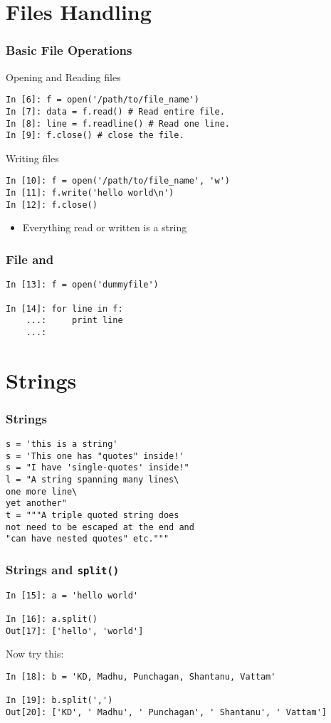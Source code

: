 \documentclass[14pt,compress]{beamer}
\newcounter{time}
\newcommand{\inctime}[1]{\addtocounter{time}{#1}{\tiny \thetime\ m}}
\newcommand{\typ}[1]{\texttt{#1}}
\newcommand{\kwrd}[1]{ \texttt{\textbf{\color{blue}{#1}}}  }
\begin{document}
\section{Files Handling}
\begin{frame}[fragile]
  \frametitle{Basic File Operations}
Opening and Reading files
\begin{lstlisting}
In [6]: f = open('/path/to/file_name')
In [7]: data = f.read() # Read entire file.
In [8]: line = f.readline() # Read one line.
In [9]: f.close() # close the file.
\end{lstlisting}
Writing files
\begin{lstlisting}
In [10]: f = open('/path/to/file_name', 'w')
In [11]: f.write('hello world\n')
In [12]: f.close()
\end{lstlisting}
\begin{itemize}
    \item Everything read or written is a string
\end{itemize}
\end{frame}

\begin{frame}[fragile]
    \frametitle{File and \kwrd{for}}
\begin{lstlisting}
In [13]: f = open('dummyfile')

In [14]: for line in f:
    ...:     print line
    ...:  
\end{lstlisting}
\inctime{10}
\end{frame}

\section{Strings}
\begin{frame}[fragile]
  \frametitle{Strings}
  \begin{lstlisting}
s = 'this is a string'
s = 'This one has "quotes" inside!'
s = "I have 'single-quotes' inside!"
l = "A string spanning many lines\
one more line\
yet another"
t = """A triple quoted string does
not need to be escaped at the end and 
"can have nested quotes" etc."""
  \end{lstlisting}
\end{frame}

\begin{frame}[fragile]\frametitle{Strings and \typ{split()}}
  \begin{lstlisting}
In [15]: a = 'hello world'

In [16]: a.split()
Out[17]: ['hello', 'world']
  \end{lstlisting}
Now try this:
  \begin{lstlisting}
In [18]: b = 'KD, Madhu, Punchagan, Shantanu, Vattam'

In [19]: b.split(',')
Out[20]: ['KD', ' Madhu', ' Punchagan', ' Shantanu', ' Vattam']
  \end{lstlisting}
\inctime{5}
\end{frame}
\end{document}
